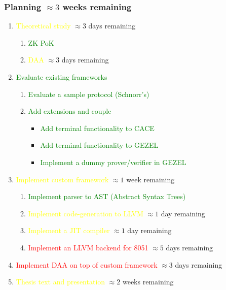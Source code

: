 \documentclass{beamer}
\begin{document}
\begin{frame}
  \frametitle{Planning $\approx 3$ weeks remaining}
  
  \begin{enumerate}
  \item \textcolor{yellow}{Theoretical study} $\approx 3$ days remaining
    \begin{enumerate}
    \item \textcolor{green}{ZK PoK}
    \item \textcolor{yellow}{DAA} $\approx 3$ days remaining
    \end{enumerate}
  \item \textcolor{green}{Evaluate existing frameworks}
    \begin{enumerate}
    \item \textcolor{green}{Evaluate a sample protocol (Schnorr's)}
    \item \textcolor{green}{Add extensions and couple}
      \begin{itemize}
      \item \textcolor{green}{Add terminal functionality to CACE}
      \item \textcolor{green}{Add terminal functionality to GEZEL}
      \item \textcolor{green}{Implement a dummy prover/verifier in GEZEL}
      \end{itemize}
    \end{enumerate}
  \item \textcolor{yellow}{Implement custom framework} $\approx 1$ week remaining
    \begin{enumerate}
    \item \textcolor{green}{Implement parser to AST (Abstract Syntax Trees)}
    \item \textcolor{yellow}{Implement code-generation to LLVM} $\approx 1$ day remaining
    \item \textcolor{yellow}{Implement a JIT compiler} $\approx 1$ day remaining
    \item \textcolor{red}{Implement an LLVM backend for 8051} $\approx 5$ days remaining
    \end{enumerate}
  \item \textcolor{red}{Implement DAA on top of custom framework} $\approx 3$ days remaining
  \item \textcolor{yellow}{Thesis text and presentation} $\approx 2$ weeks remaining
  \end{enumerate}
\end{frame}
\end{document}
